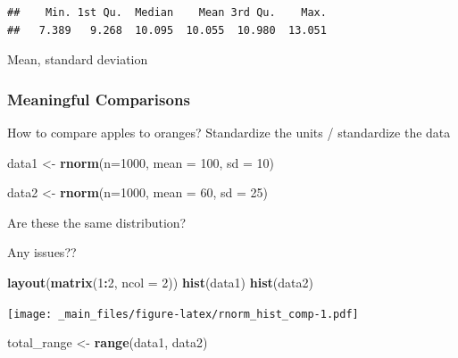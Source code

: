\documentclass[
]{book}
\newenvironment{Shaded}{\begin{snugshade}}{\end{snugshade}}
\newcommand{\DataTypeTok}[1]{\textcolor[rgb]{0.13,0.29,0.53}{#1}}
\newcommand{\DecValTok}[1]{\textcolor[rgb]{0.00,0.00,0.81}{#1}}
\newcommand{\KeywordTok}[1]{\textcolor[rgb]{0.13,0.29,0.53}{\textbf{#1}}}
\newcommand{\NormalTok}[1]{#1}
\newcommand{\OperatorTok}[1]{\textcolor[rgb]{0.81,0.36,0.00}{\textbf{#1}}}
\newcommand{\StringTok}[1]{\textcolor[rgb]{0.31,0.60,0.02}{#1}}
\begin{document}
\begin{verbatim}
##    Min. 1st Qu.  Median    Mean 3rd Qu.    Max. 
##   7.389   9.268  10.095  10.055  10.980  13.051
\end{verbatim}

Mean, standard deviation

\hypertarget{meaningful-comparisons}{%
\subsubsection{Meaningful Comparisons}\label{meaningful-comparisons}}

How to compare apples to oranges? Standardize the units / standardize the data

\begin{Shaded}
\begin{Highlighting}[]
\NormalTok{data1 <-}\StringTok{ }\KeywordTok{rnorm}\NormalTok{(}\DataTypeTok{n=}\DecValTok{1000}\NormalTok{, }
              \DataTypeTok{mean =} \DecValTok{100}\NormalTok{,}
              \DataTypeTok{sd =} \DecValTok{10}\NormalTok{)}

\NormalTok{data2 <-}\StringTok{ }\KeywordTok{rnorm}\NormalTok{(}\DataTypeTok{n=}\DecValTok{1000}\NormalTok{,}
               \DataTypeTok{mean =} \DecValTok{60}\NormalTok{, }
               \DataTypeTok{sd =} \DecValTok{25}\NormalTok{)}
\end{Highlighting}
\end{Shaded}

Are these the same distribution?

Any issues??

\begin{Shaded}
\begin{Highlighting}[]
\KeywordTok{layout}\NormalTok{(}\KeywordTok{matrix}\NormalTok{(}\DecValTok{1}\OperatorTok{:}\DecValTok{2}\NormalTok{, }\DataTypeTok{ncol =} \DecValTok{2}\NormalTok{))}
\KeywordTok{hist}\NormalTok{(data1)}
\KeywordTok{hist}\NormalTok{(data2)}
\end{Highlighting}
\end{Shaded}

\texttt{[image: \_main\_files/figure-latex/rnorm\_hist\_comp-1.pdf]}

\begin{Shaded}
\begin{Highlighting}[]
\NormalTok{total_range <-}\StringTok{ }\KeywordTok{range}\NormalTok{(data1, data2)}
\end{Highlighting}
\end{Shaded}
\end{document}
